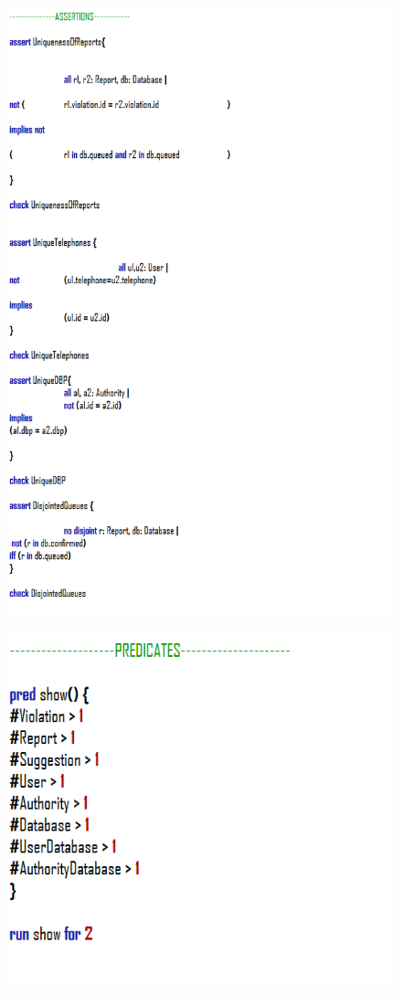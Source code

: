 \documentclass[12pt,a4paper]{article}
\begin{document}
			\begin{figure}[H]
				\centering
				\includegraphics[width=1\linewidth]{../assets/images/exports/user/Assertions.png}
				\label{fig:assertions}
			\end{figure}
			\begin{figure}[H]
				\centering
				\includegraphics[width=0.9\linewidth]{../assets/images/exports/user/Predicates.png}
				\label{fig:predicates}
			\end{figure}
\end{document}
